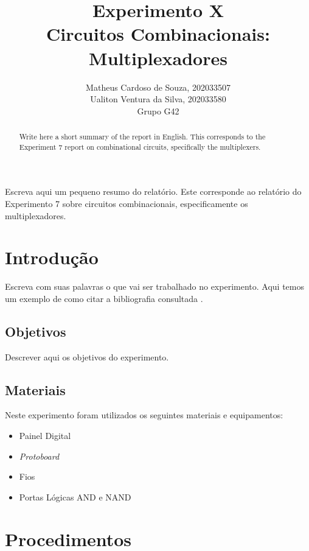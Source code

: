 \documentclass[12pt]{article}
\title{Experimento X\\ 
Circuitos Combinacionais: Multiplexadores}
\author{Matheus Cardoso de Souza, 202033507\\
        Ualiton Ventura da Silva, 202033580\\
        Grupo G42
}
\begin{document}
 
\maketitle

 \begin{abstract}
   Write here a short summary of the report in English. This corresponds to the Experiment 7 report on combinational circuits, specifically the multiplexers.
 \end{abstract}
    
 \begin{resumo} 
  Escreva aqui um pequeno resumo do relatório. Este corresponde ao relatório do Experimento 7 sobre circuitos combinacionais, especificamente os multiplexadores.
 \end{resumo}


\section{Introdução}
\label{sec:Introducao}

Escreva com suas palavras o que vai ser trabalhado no experimento. Aqui temos um exemplo de como citar a bibliografia consultada \cite{boulic:91} \cite{smith:99}.

\subsection{Objetivos}
\label{sec:Objetivos}

Descrever aqui os objetivos do experimento.

\subsection{Materiais} 
\label{sec:Materiais}
Neste experimento foram utilizados os seguintes materiais e equipamentos:
\begin{itemize}
    \item Painel Digital

    \item \textit{Protoboard}
    
    \item Fios
    
    \item Portas Lógicas AND e NAND
\end{itemize}

\section{Procedimentos}
\label{sec:Procedimentos}
\end{document}
